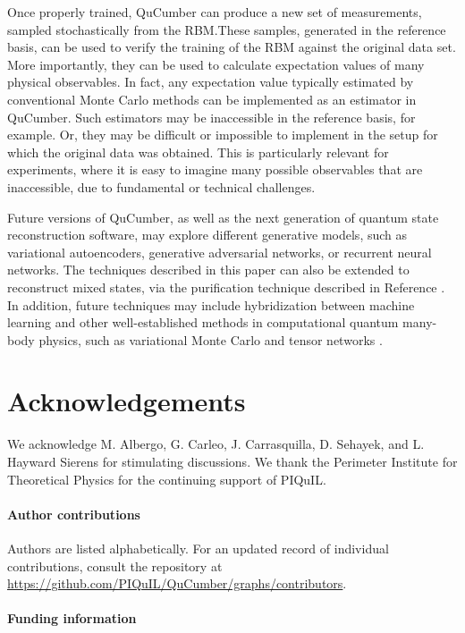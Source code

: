 \documentclass[submission, Phys, hidelnks]{SciPost}
\begin{document}
Once properly trained, QuCumber can produce a new set of measurements,
sampled stochastically from the RBM.\@ These samples, generated in the
reference basis, can be used to verify the training of the RBM against the
original data set. More importantly, they can be used to calculate expectation
values of many physical observables. In fact, any expectation value typically
estimated by conventional Monte Carlo methods can be implemented as an
estimator in QuCumber. Such estimators may be inaccessible in the reference
basis, for example. Or, they may be difficult or impossible to implement in the
setup for which the original data was obtained.  This is particularly relevant
for experiments, where it is easy to imagine many possible observables that are
inaccessible, due to fundamental or technical challenges.

Future versions of QuCumber, as well as the next generation of quantum state
reconstruction software, may explore different generative models, such as
variational autoencoders, generative adversarial networks, or recurrent neural networks.
The techniques described in this paper can also be extended to reconstruct mixed states,
via the purification technique described in Reference \cite{torlai_latent_2018}.
In addition, future techniques may include hybridization between machine
learning and other well-established methods in computational quantum many-body
physics, such as variational Monte Carlo and tensor networks \cite{carrasquilla_reconstructing_2018}.

\section*{Acknowledgements}
We acknowledge M. Albergo, G. Carleo, J. Carrasquilla, D. Sehayek, and
L. Hayward Sierens for stimulating discussions.
We thank the Perimeter Institute for Theoretical Physics for the continuing support of PIQuIL.\@

\paragraph{Author contributions}
Authors are listed alphabetically. For an updated record of individual
contributions, consult the repository
at \url{https://github.com/PIQuIL/QuCumber/graphs/contributors}.

\paragraph{Funding information}
\end{document}
